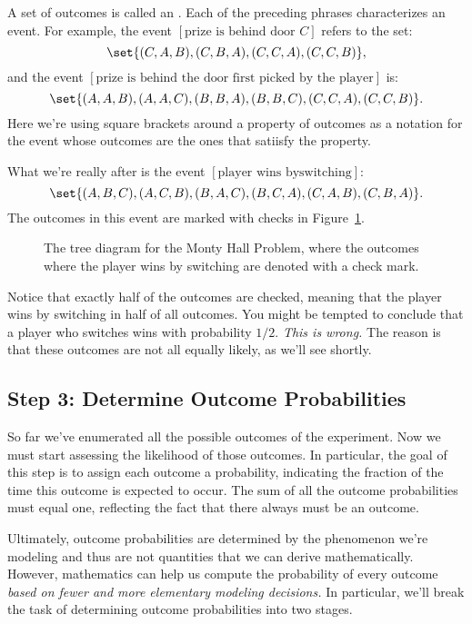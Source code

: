 A set of outcomes is called an .  Each of the preceding
phrases characterizes an event.  For example, the event
$[\text{prize is behind door $C$}]$ refers to the set:
%
\[
    \set{(C, A, B), (C, B, A), (C, C, A), (C, C, B)},
\]
%
and the event $[\text{prize is behind the door first picked
    by the player}]$ is:
%
\[
    \set{(A, A, B), (A, A, C), (B, B, A), (B, B, C), (C, C, A), (C, C, B)}.
\]
%
Here we're using square brackets around a property of outcomes as a
notation for the event whose outcomes are the ones that satiisfy the
property.

What we're really after is the event $[\text{player wins byswitching}]$:
\begin{equation}\label{swwin-event}
\set{(A, B, C), (A, C, B), (B, A, C), (B, C, A), (C, A, B), (C, B, A)}.
\end{equation}
The outcomes in this event are marked with checks in Figure~\ref{fig:14A4}.
\begin{figure}


\caption{The tree diagram for the Monty Hall Problem, where the
  outcomes where the player wins by switching are denoted with a
  check mark.}

\label{fig:14A4}

\end{figure}

Notice that exactly half of the outcomes are checked, meaning that the
player wins by switching in half of all outcomes.  You might be
tempted to conclude that a player who switches wins with probability
$1/2$.  \emph{This is wrong.}  The reason is that these outcomes are
not all equally likely, as we'll see shortly.

\subsection{Step 3: Determine Outcome Probabilities}

So far we've enumerated all the possible outcomes of the experiment.
Now we must start assessing the likelihood of those outcomes.  In
particular, the goal of this step is to assign each outcome a
probability, indicating the fraction of the time this outcome is
expected to occur.  The sum of all the outcome probabilities must
equal one, reflecting the fact that there always must be an outcome.

Ultimately, outcome probabilities are determined by the phenomenon
we're modeling and thus are not quantities that we can derive
mathematically.  However, mathematics can help us compute the
probability of every outcome \emph{based on fewer and more
elementary modeling decisions.}  In particular, we'll break the task
of determining outcome probabilities into two stages.

